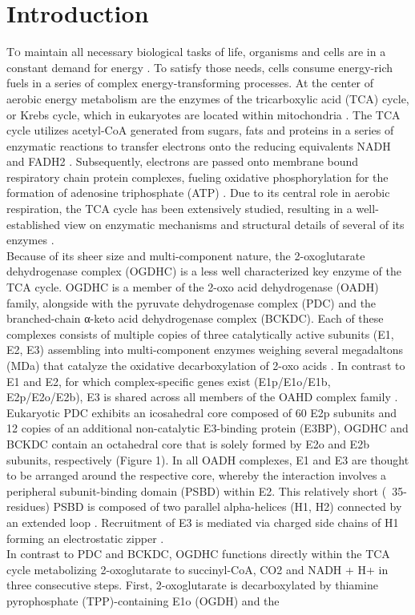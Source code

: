 \documentclass[times, twoside]{zHenriquesLab-StyleBioRxiv}
\begin{document}
\section*{Introduction}
\lettrine[lines=2,lraise=0.05,findent=0.1em, nindent=0em]{T}o maintain all necessary biological tasks of life, organisms and cells are in a constant demand for energy \cite{Rigoulet_2020}. To satisfy those needs, cells consume energy-rich fuels in a series of complex energy-transforming processes. At the center of aerobic energy metabolism are the enzymes of the tricarboxylic acid (TCA) cycle, or Krebs cycle, which in eukaryotes are located within mitochondria \cite{Cavalcanti_2014,Martinez-Reyes_2020,Siriwat_2018}. The TCA cycle utilizes acetyl-CoA generated from sugars, fats and proteins in a series of enzymatic reactions to transfer electrons onto the reducing equivalents NADH and FADH2 \cite{Walsh_2018}. Subsequently, electrons are passed onto membrane bound respiratory chain protein complexes, fueling oxidative phosphorylation for the formation of adenosine triphosphate (ATP) \cite{Kaila_2021,Martinez-Reyes_2016}. Due to its central role in aerobic respiration, the TCA cycle has been extensively studied, resulting in a well-established view on enzymatic mechanisms and structural details of several of its enzymes \cite{Gleason_1994,Joyce_2000,Lauble_1992,Remington_1982,Spinelli_2018,Taylor_2008,Weaver_1996,Yankovskaya_2003}.\\
Because of its sheer size and multi-component nature, the 2-oxoglutarate dehydrogenase complex (OGDHC) is a less well characterized key enzyme of the TCA cycle. OGDHC is a member of the 2-oxo acid dehydrogenase (OADH) family, alongside with the pyruvate dehydrogenase complex (PDC) and the branched-chain α-keto acid dehydrogenase complex (BCKDC). Each of these complexes consists of multiple copies of three catalytically active subunits (E1, E2, E3) assembling into multi-component enzymes weighing several megadaltons (MDa) that catalyze the oxidative decarboxylation of 2-oxo acids \cite{Reed_2001, Zhong_2022}. In contrast to E1 and E2, for which complex-specific genes exist (E1p/E1o/E1b, E2p/E2o/E2b), E3 is shared across all members of the OAHD complex family \cite{Nemeria_2021}. Eukaryotic PDC exhibits an icosahedral core composed of 60 E2p subunits and 12 copies of an additional non-catalytic E3-binding protein (E3BP), OGDHC and BCKDC contain an octahedral core that is solely formed by E2o and E2b subunits, respectively (Figure 1). In all OADH complexes, E1 and E3 are thought to be arranged around the respective core, whereby the interaction involves a peripheral subunit-binding domain (PSBD) within E2. This relatively short (~35-residues) PSBD is composed of two parallel alpha-helices (H1, H2) connected by an extended loop \cite{Robien_1992}. Recruitment of E3 is mediated via charged side chains of H1 forming an electrostatic zipper \cite{Mande_1996}.\\
In contrast to PDC and BCKDC, OGDHC functions directly within the TCA cycle metabolizing 2-oxoglutarate to succinyl-CoA, CO2 and NADH + H+ in three consecutive steps. First, 2-oxoglutarate is decarboxylated by thiamine pyrophosphate (TPP)-containing E1o (OGDH) and the
\end{document}

